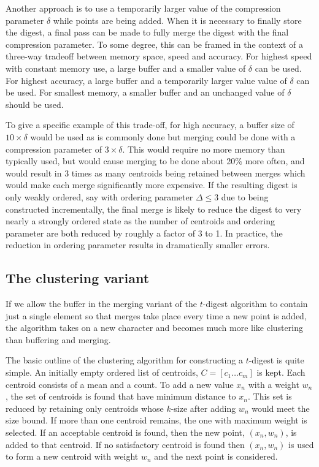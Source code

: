 \documentclass[11pt]{amsart}
\begin{document}
Another approach is to use a temporarily larger value of the compression parameter $\delta$ while points are being added. When it is necessary to finally store the digest, a final pass can be made to fully merge the digest with the final compression parameter. To some degree, this can be framed in the context of a three-way tradeoff between memory space, speed and accuracy. For highest speed with constant memory use, a large buffer and a smaller value of $\delta$ can be used. For highest accuracy, a large buffer and a temporarily larger value value of $\delta$ can be used. For smallest memory, a smaller buffer and an unchanged value of $\delta$ should be used. 

To give a specific example of this trade-off, for high accuracy, a buffer size of $10\times\delta$ would be used as is commonly done but merging could be done with a compression parameter of $3\times\delta$. This would require no more memory than typically used, but would cause merging to be done about 20\% more often, and would result in 3 times as many centroids being retained between merges which would make each merge significantly more expensive. If the resulting digest is only weakly ordered, say with ordering parameter $\Delta \le 3$ due to being constructed incrementally, the final merge is likely to reduce the digest to very nearly a strongly ordered state as the number of centroids and ordering parameter are both reduced by roughly a factor of 3 to 1. In practice, the reduction in ordering parameter results in dramatically smaller errors.

\subsection{The clustering variant}
If we allow the buffer in the merging variant of the $t$-digest algorithm to contain just a single element so that merges take place every time a new point is added, the algorithm takes on a new character and becomes much more like clustering than buffering and merging.

The basic outline of the clustering algorithm for constructing a $t$-digest is quite simple.  An initially empty ordered list of centroids, $C = [ c_1 \ldots c_m ]$ is kept.  Each centroid consists of a mean and a count.  To add a new value $x_n$ with a weight $w_n$, the set of centroids is found that have minimum distance to $x_n$.  This set is reduced by retaining only centroids whose $k$-size after adding $w_n$ would meet the size bound.  If more than one centroid remains, the one with maximum weight is selected.  If an acceptable centroid is found, then the new point, $(x_n,w_n)$, is added to that centroid. If no satisfactory centroid is found then $(x_n,w_n)$ is used to form a new centroid with weight $w_n$ and the next point is considered. 
\end{document}

